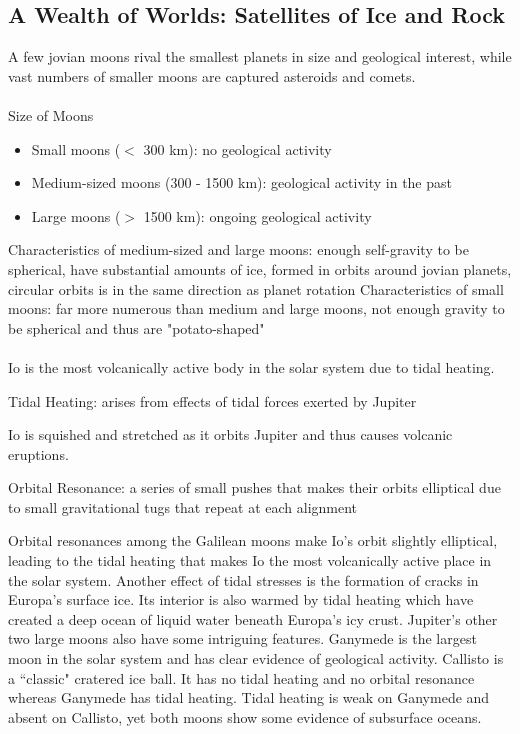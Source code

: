\documentclass[12pt]{article}
\begin{document}
\subsection{A Wealth of Worlds: Satellites of Ice and Rock} 
A few jovian moons rival the smallest planets in size and geological interest, while vast numbers of smaller moons are captured asteroids and comets. \\~\\
Size of Moons \begin{itemize} 
\item Small moons ($<$ 300 km): no geological activity 
\item Medium-sized moons (300 - 1500 km): geological activity in the past 
\item Large moons ($>$ 1500 km): ongoing geological activity \end{itemize} 
Characteristics of medium-sized and large moons: enough self-gravity to be spherical, have substantial amounts of ice, formed in orbits around jovian planets, circular orbits is in the same direction as planet rotation \newline
Characteristics of small moons: far more numerous than medium and large moons, not enough gravity to be spherical and thus are "potato-shaped" \\~\\ 
Io is the most volcanically active body in the solar system due to tidal heating. 
\begin{definition} Tidal Heating: arises from effects of tidal forces exerted by Jupiter \end{definition} 
Io is squished and stretched as it orbits Jupiter and thus causes volcanic eruptions. 
\begin{definition} Orbital Resonance: a series of small pushes that makes their orbits elliptical due to small gravitational tugs that repeat at each alignment \end{definition} 
Orbital resonances among the Galilean moons make Io's orbit slightly elliptical, leading to the tidal heating that makes Io the most volcanically active place in the solar system. Another effect of tidal stresses is the formation of cracks in Europa's surface ice. Its interior is also warmed by tidal heating which have created a deep ocean of liquid water beneath Europa's icy crust. Jupiter's other two large moons also have some intriguing features. Ganymede is the largest moon in the solar system and has clear evidence of geological activity. Callisto is a ``classic" cratered ice ball. It has no tidal heating and no orbital resonance whereas Ganymede has tidal heating. Tidal heating is weak on Ganymede and absent on Callisto, yet both moons show some evidence of subsurface oceans. \\~\\
\end{document}
